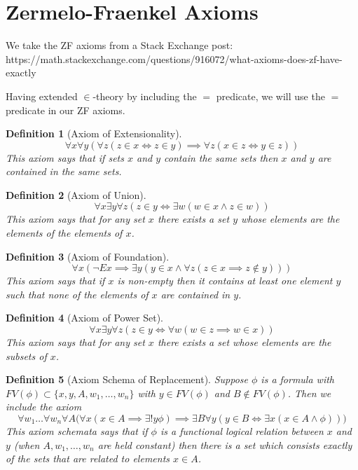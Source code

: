 \documentclass[12pt]{article}
\theoremstyle{break}
\newtheorem{definition}{Definition}[section]
\theoremstyle{break}
\theoremstyle{break}
\theoremstyle{break}
\theoremstyle{break}
\newtheorem{informal definition}[definition]{Informal Definition}
\begin{document}
\section{Zermelo-Fraenkel Axioms}

We take the ZF axioms from a Stack Exchange post: https://math.stackexchange.com/questions/916072/what-axioms-does-zf-have-exactly

Having extended $\in$-theory by including the $=$ predicate, we will use the $=$ predicate in our ZF axioms.

\begin{definition}[Axiom of Extensionality]
$$
\forall x \forall y(\forall z (z\in x \iff z \in y) \implies \forall z(x\in z \iff y \in z))
$$
This axiom says that if sets $x$ and $y$ contain the same sets then $x$ and $y$ are contained in the same sets.
\end{definition}

\begin{definition}[Axiom of Union]
$$
\forall x \exists y \forall z (z\in y \iff \exists w (w\in x \land z\in w))
$$
This axiom says that for any set $x$ there exists a set $y$ whose elements are the elements of the elements of $x$.
\end{definition}

\begin{definition}[Axiom of Foundation]
$$
\forall x (\lnot Ex \implies \exists y(y\in x \land \forall z(z\in x \implies z \not \in y)))
$$
This axiom says that if $x$ is non-empty then it contains at least one element $y$ such that none of the elements of $x$ are contained in $y$.
\end{definition}

\begin{definition}[Axiom of Power Set]
$$
\forall x \exists y \forall z (z\in y \iff \forall w (w \in z \implies w \in x))
$$
This axiom says that for any set $x$ there exists a set whose elements are the subsets of $x$.
\end{definition}

\begin{definition}[Axiom Schema of Replacement]
Suppose $\phi$ is a formula with $FV(\phi) \subset \{x, y, A, w_1, \ldots, w_n\}$ with $y\in FV(\phi)$ and $B\not \in FV(\phi)$.
Then we include the axiom
$$
\forall w_1\ldots\forall w_n \forall A \Big( \forall x(x\in A \implies \exists!y \phi)  \implies \exists B \forall y(y\in B \iff \exists x (x\in A \land \phi))\Big)
$$
This axiom schemata says that if $\phi$ is a functional logical relation between $x$ and $y$ (when $A, w_1, \ldots, w_n$ are held constant) then there is a set which consists exactly of the sets that are related to elements $x\in A$.
\end{definition}
\end{document}
